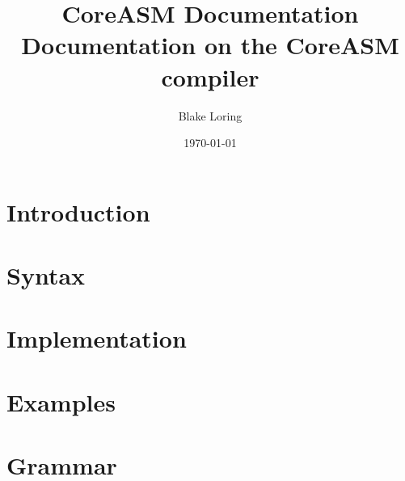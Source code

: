 \documentclass{report}
\begin{document}
\title{CoreASM Documentation \\ \large Documentation on the CoreASM compiler}
\author{Blake Loring}
\date{\today}

\maketitle

\chapter {Introduction}
\chapter {Syntax}
\chapter {Implementation}
\chapter {Examples}
\chapter {Grammar}
\end{document}
